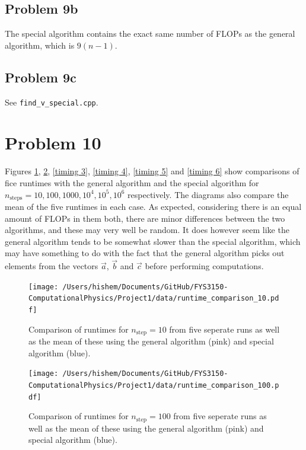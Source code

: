 \documentclass[english,notitlepage]{revtex4-1}  %
\begin{document}
\subsection*{Problem 9b}
The special algorithm contains the exact same number of FLOPs as the general algorithm, which is $9(n-1)$.

\subsection*{Problem 9c}
See \verb|find_v_special.cpp|.


\section*{Problem 10}
Figures \ref{timing 1}, \ref{timing 2}, \ref{timing 3}, \ref{timing 4}, \ref{timing 5} and \ref{timing 6} show comparisons of fice runtimes with the general algorithm and the special algorithm for $n_\text{steps} = 10, 100, 1000, 10^4, 10^5, 10^6$ respectively. The diagrams also compare the mean of the five runtimes in each case. As expected, considering there is an equal amount of FLOPs in them both, there are minor differences between the two algorithms, and these may very well be random. It does however seem like the general algorithm tends to be somewhat slower than the special algorithm, which may have something to do with the fact that the general algorithm picks out elements from the vectors $\vec{a}$, $\vec{b}$ and $\vec{c}$ before performing computations.

\begin{figure}[h!]
    \vspace*{20pt}
    \centering 
    \texttt{[image: /Users/hishem/Documents/GitHub/FYS3150-ComputationalPhysics/Project1/data/runtime\_comparison\_10.pdf]} %
    \caption{Comparison of runtimes for $n_\text{step} = 10$ from five seperate runs as well as the mean of these using the general algorithm (pink) and special algorithm (blue).}
    \label{timing 1}
\end{figure}

\begin{figure}[h!]
    \centering 
    \texttt{[image: /Users/hishem/Documents/GitHub/FYS3150-ComputationalPhysics/Project1/data/runtime\_comparison\_100.pdf]} %
    \caption{Comparison of runtimes for $n_\text{step} = 100$ from five seperate runs as well as the mean of these using the general algorithm (pink) and special algorithm (blue).}
    \label{timing 2}
\end{figure}
\end{document}
